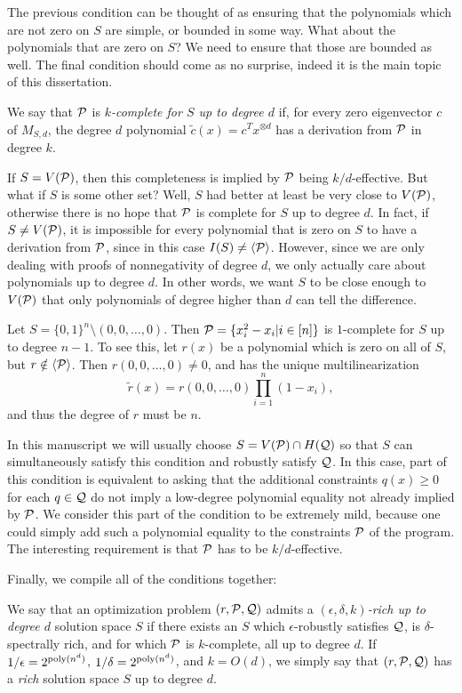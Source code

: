The previous condition can be thought of as ensuring that the polynomials which are not zero on $S$ are simple, or bounded in some way. What about the polynomials that are zero on $S$? We need to ensure that those are bounded as well. The final condition should come as no surprise, indeed it is the main topic of this dissertation. 
\begin{definition}
We say that $\mathcal P$ is \emph{$k$-complete for $S$ up to degree $d$} if, for every zero eigenvector $c$ of $M_{S,d}$, the degree $d$ polynomial $\tilde{c}(x) = c^Tx^{\otimes d}$ has a derivation from $\mathcal P$ in degree $k$.
\end{definition}
If $S = V(\mathcal P)$, then this completeness is implied by $\mathcal P$ being $k/d$-effective. But what if $S$ is some other set? Well, $S$ had better at least be very close to $V(\mathcal P)$, otherwise there is no hope that $\mathcal P$ is complete for $S$ up to degree $d$. In fact, if $S \neq V(\mathcal P)$, it is impossible for every polynomial that is zero on $S$ to have a derivation from $\mathcal P$, since in this case $I(S) \neq \langle \mathcal P \rangle$. However, since we are only dealing with proofs of nonnegativity of degree $d$, we only actually care about polynomials up to degree $d$. In other words, we want $S$ to be close enough to $V(\mathcal P)$ that only polynomials of degree higher than $d$ can tell the difference.
\begin{example}
Let $S = \{0,1\}^n \setminus (0,0,\dots,0)$. Then $\mathcal P = \{x_i^2 - x_i | i \in [n]\}$ is $1$-complete for $S$ up to degree $n-1$. To see this, let $r(x)$ be a polynomial which is zero on all of $S$, but $r \notin \langle \mathcal P \rangle$. Then $r(0,0,\dots,0) \neq 0$, and has the unique multilinearization 
\[\tilde{r}(x) = r(0,0,\dots,0)\prod_{i=1}^n \left(1-x_i\right),\]
and thus the degree of $r$ must be $n$.
\end{example}
In this manuscript we will usually choose $S = V(\mathcal P) \cap H(\mathcal Q)$ so that $S$ can simultaneously satisfy this condition and robustly satisfy $\mathcal Q$. In this case, part of this condition is equivalent to asking that the additional constraints $q(x) \geq 0$ for each $q \in \mathcal Q$ do not imply a low-degree polynomial equality not already implied by $\mathcal P$. We consider this part of the condition to be extremely mild, because one could simply add such a polynomial equality to the constraints $\mathcal P$ of the program. The interesting requirement is that $\mathcal P$ has to be $k/d$-effective. 

Finally, we compile all of the conditions together:
\begin{definition}
We say that an optimization problem $(r, \mathcal P, \mathcal Q)$ admits a \emph{$(\epsilon,\delta,k)$-rich up to degree $d$} solution space $S$ if there exists an $S$ which $\epsilon$-robustly satisfies $\mathcal Q$, is $\delta$-spectrally rich, and for which $\mathcal P$ is $k$-complete, all up to degree $d$. If $1/\epsilon = 2^{\operatorname{poly}(n^d)}$, $1/\delta = 2^{\operatorname{poly}(n^d)}$, and $k = O(d)$, we simply say that $(r, \mathcal P, \mathcal Q)$ has a \emph{rich} solution space $S$ up to degree $d$.
\end{definition}

